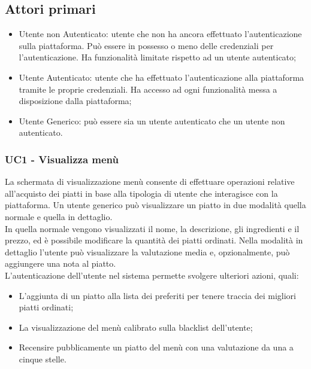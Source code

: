 \subsection{Attori primari}
\begin{itemize}
    \item Utente non Autenticato: utente che non ha ancora effettuato l'autenticazione sulla piattaforma. Può essere in possesso o meno delle credenziali per l'autenticazione. Ha funzionalità limitate rispetto ad un utente autenticato;
    \item Utente Autenticato: utente che ha effettuato l'autenticazione alla piattaforma tramite le proprie credenziali. Ha accesso ad ogni funzionalità messa a disposizione dalla piattaforma;
    \item  Utente Generico: può essere sia un utente autenticato che un utente non autenticato.
\end{itemize}
\subsubsection{UC1 - Visualizza menù}
La schermata di visualizzazione menù consente di effettuare operazioni relative all'acquisto dei piatti in base alla tipologia di utente che interagisce con la piattaforma.
Un utente generico può visualizzare un piatto in due modalità quella normale e quella in dettaglio.\\
In quella normale vengono visualizzati il nome, la descrizione, gli ingredienti e il prezzo, ed è possibile modificare la quantità dei piatti ordinati.
Nella modalità in dettaglio l'utente può visualizzare la valutazione media e, opzionalmente, può aggiungere una nota al piatto.\\
L'autenticazione dell'utente nel sistema permette svolgere ulteriori azioni, quali:\\
\begin{itemize}
    \item L'aggiunta di un piatto alla lista dei preferiti per tenere traccia dei migliori piatti ordinati;
    \item La visualizzazione del menù calibrato sulla blacklist dell'utente;
    \item Recensire pubblicamente un piatto del menù con una valutazione da una a cinque stelle.
\end{itemize}
